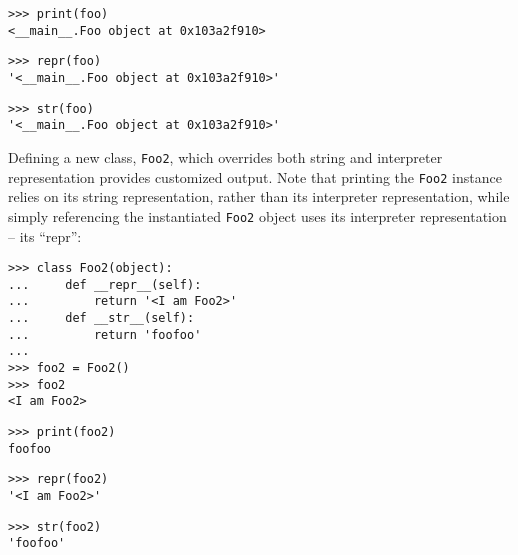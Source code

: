 \begin{comment}
<abjad>
print(foo)
repr(foo)
str(foo)
</abjad>
\end{comment}

\begin{abjadbookoutput}
\begin{singlespacing}
\vspace{-0.5\baselineskip}
\begin{lstlisting}
>>> print(foo)
<__main__.Foo object at 0x103a2f910>
\end{lstlisting}
\begin{lstlisting}
>>> repr(foo)
'<__main__.Foo object at 0x103a2f910>'
\end{lstlisting}
\begin{lstlisting}
>>> str(foo)
'<__main__.Foo object at 0x103a2f910>'
\end{lstlisting}
\end{singlespacing}
\end{abjadbookoutput}

\noindent Defining a new class, \texttt{Foo2}, which overrides both string and
interpreter representation provides customized output. Note that printing the
\texttt{Foo2} instance relies on its string representation, rather than its
interpreter representation, while simply referencing the instantiated
\texttt{Foo2} object uses its interpreter representation -- its \enquote{repr}:

\begin{comment}
<abjad>
class Foo2(object):
    def __repr__(self):
        return '<I am Foo2>'
    def __str__(self):
        return 'foofoo'

foo2 = Foo2()
foo2
print(foo2)
repr(foo2)
str(foo2)
</abjad>
\end{comment}

\begin{abjadbookoutput}
\begin{singlespacing}
\vspace{-0.5\baselineskip}
\begin{lstlisting}
>>> class Foo2(object):
...     def __repr__(self):
...         return '<I am Foo2>'
...     def __str__(self):
...         return 'foofoo'
...
>>> foo2 = Foo2()
>>> foo2
<I am Foo2>
\end{lstlisting}
\begin{lstlisting}
>>> print(foo2)
foofoo
\end{lstlisting}
\begin{lstlisting}
>>> repr(foo2)
'<I am Foo2>'
\end{lstlisting}
\begin{lstlisting}
>>> str(foo2)
'foofoo'
\end{lstlisting}
\end{singlespacing}
\end{abjadbookoutput}

